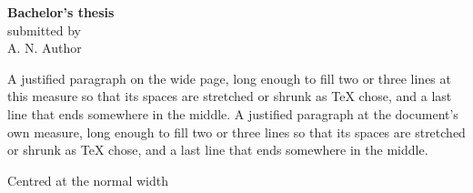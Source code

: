 \documentclass[12pt]{report}
\begin{document}
\begin{center}
{\LARGE\bfseries\sffamily Bachelor's thesis}\\[1ex]
submitted by\\
A. N. Author
\end{center}
A justified paragraph on the wide page, long enough to fill two or three lines at this measure so that
its spaces are stretched or shrunk as TeX chose, and a last line that ends somewhere in the middle.
\restoregeometry
\clearpage
A justified paragraph at the document's own measure, long enough to fill two or three lines so that its
spaces are stretched or shrunk as TeX chose, and a last line that ends somewhere in the middle.
\begin{center}Centred at the normal width\end{center}
\end{document}
